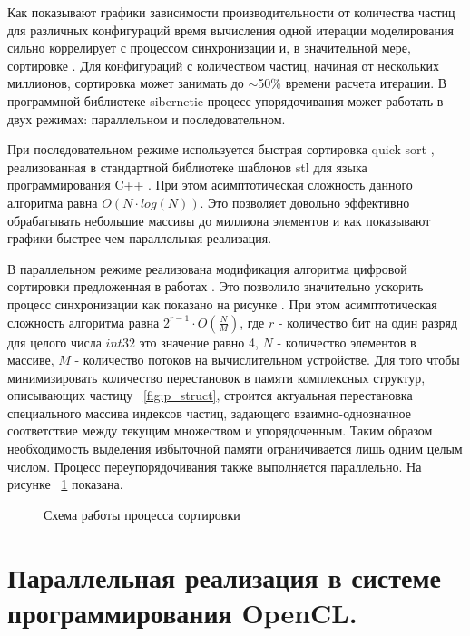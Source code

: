 Как показывают графики зависимости производительности от количества частиц для различных конфигураций время вычисления одной итерации моделирования сильно коррелирует с процессом синхронизации и, в значительной мере, сортировке . Для  конфигураций с количеством частиц, начиная от нескольких миллионов, сортировка может занимать до \(\sim \)50\% времени расчета итерации. В программной библиотеке sibernetic \cite{Palyanov2016} процесс упорядочивания может работать в двух режимах: параллельном и последовательном.

При последовательном режиме используется быстрая сортировка quick sort \cite{Hoare1962}, реализованная в стандартной библиотеке шаблонов stl \cite{Stepanov1995} для языка программирования C++ \cite{Stroustrup2013}. При этом асимптотическая сложность данного алгоритма равна \( O(N \cdot log(N)) \). Это позволяет довольно эффективно обрабатывать небольшие массивы до миллиона элементов и как показывают графики быстрее чем параллельная реализация.

В параллельном режиме реализована модификация алгоритма цифровой сортировки предложенная в работах \cite{Knuth1998, Marcho1991}. Это позволило значительно ускорить процесс синхронизации как показано на рисунке . При этом асимптотическая сложность алгоритма равна \( 2^{r-1} \cdot O(\frac{N}{M}) \), где \( r \) - количество бит на один разряд для целого числа \( int32 \) это значение равно 4, \( N \) - количество элементов в массиве, \( M \) - количество потоков на вычислительном устройстве. Для того чтобы минимизировать количество перестановок в памяти комплексных структур, описывающих частицу ~\ref{fig:p_struct}, строится актуальная перестановка специального массива  индексов частиц, задающего взаимно-однозначное соответствие между текущим множеством и упорядоченным. Таким образом необходимость выделения избыточной памяти ограничивается лишь одним целым числом.
Процесс переупорядочивания также выполняется параллельно.  На рисунке ~\ref{fig:sort1} показана.
\begin{figure}[ht]
  \caption{Схема работы процесса сортировки}\label{fig:sort1}
\end{figure}

\section{Параллельная реализация в системе программирования OpenCL.}\label{sec:ch3/sect3}

